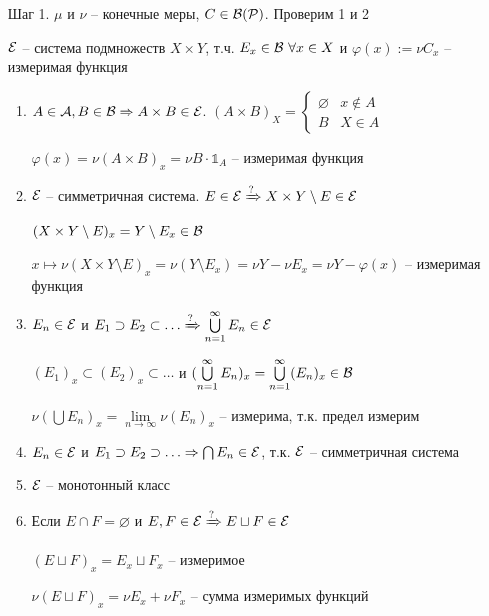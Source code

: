 \documentclass[12pt]{article}
\begin{document}
\begin{enumerate}
    \item[Шаг 1. ] $\mu$ и $\nu$ -- конечные меры, $C \in \mathcal{B}(\mathcal{P})$. Проверим 1 и 2
    
    $\mathcal{E}$ -- система подмножеств $X \times Y$, т.ч. $E_x \in \mathcal{B}\ \forall x \in X$ и $\varphi(x) := \nu C_x$ -- измеримая функция 

    \begin{enumerate}
        \item $A \in \mathcal{A}, B \in \mathcal{B} \Rightarrow A \times B \in \mathcal{E}$. $(A \times B)_X = \begin{cases}
            \varnothing & x \notin A \\
            B & X \in A 
        \end{cases}$

        $\varphi(x) = \nu (A \times B)_x = \nu B \cdot \mathbb{1}_A$ -- измеримая функция 

        \item $\mathcal{E}$ -- симметричная система. $E \in \mathcal{E} \xRightarrow[]{?} X \times Y \setminus E \in \mathcal{E}$
        
        $(X \times Y \setminus E)_x = Y \setminus E_x \in \mathcal{B}$
        
        $x \mapsto \nu(X \times Y \setminus E)_x = \nu(Y \setminus E_x) = \nu Y - \nu E_x = \nu Y - \varphi(x)$ -- измеримая функция 

        \newpage

        \item $E_n \in \mathcal{E}$ и $E_1 \supset E_2 \subset \ldots \xRightarrow[]{?} \bigcup\limits_{n = 1}^\infty E_n \in \mathcal{E}$
        
        $(E_1)_x \subset (E_2)_x \subset \ldots$ и $(\bigcup\limits_{n = 1}^\infty E_n)_x = \bigcup\limits_{n = 1}^\infty (E_n)_x \in \mathcal{B}$

        $\nu(\bigcup E_n)_x = \lim\limits_{n \to \infty} \nu (E_n)_x$ -- измерима, т.к. предел измерим

        \item $E_n \in \mathcal{E}$ и $E_1 \supset E_2 \supset \ldots \Rightarrow \bigcap E_n \in \mathcal{E}$, т.к. $\mathcal{E}$ -- симметричная система 
        \item $\mathcal{E}$ -- монотонный класс 
        \item Если $E \cap F = \varnothing$ и $E, F \in \mathcal{E} \xRightarrow[]{?} E \sqcup F \in \mathcal{E}$
        
        $(E \sqcup F)_x = E_x \sqcup F_x$ -- измеримое 
        
        $\nu (E \sqcup F)_x = \nu E_x + \nu F_x$ -- сумма измеримых функций 


\end{enumerate}
\end{enumerate}
\end{document}
